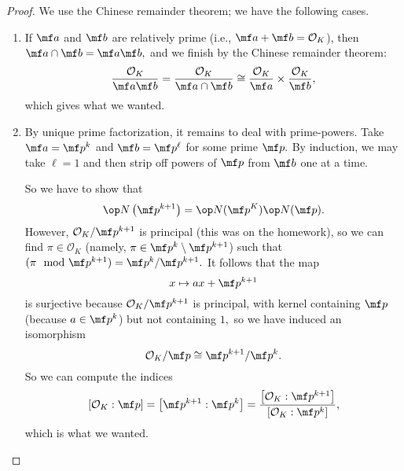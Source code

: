 \documentclass[../notes.tex]{subfiles}
\begin{document}
\begin{proof}
    We use the Chinese remainder theorem; we have the following cases.
    \begin{enumerate}
        \item If $\mf a$ and $\mf b$ are relatively prime (i.e., $\mf a+\mf b=\mathcal O_K$), then $\mf a\cap\mf b=\mf a\mf b,$ and we finish by the Chinese remainder theorem:
        \[\frac{\mathcal O_K}{\mf a\mf b}=\frac{\mathcal O_K}{\mf a\cap\mf b}\cong\frac{\mathcal O_K}{\mf a}\times\frac{\mathcal O_K}{\mf b},\]
        which gives what we wanted.
        \item By unique prime factorization, it remains to deal with prime-powers. Take $\mf a=\mf p^k$ and $\mf b=\mf p^\ell$ for some prime $\mf p.$ By induction, we may take $\ell=1$ and then strip off powers of $\mf p$ from $\mf b$ one at a time.

        So we have to show that
        \[\op N\left(\mf p^{k+1}\right)=\op N(\mf p^K)\op N(\mf p).\]
        However, $\mathcal O_K/\mf p^{k+1}$ is principal (this was on the homework), so we can find $\pi\in\mathcal O_K$ (namely, $\pi\in\mf p^k\setminus\mf p^{k+1}$) such that $(\pi\mod\mf p^{k+1})=\mf p^k/\mf p^{k+1}.$ It follows that the map
        \[x\mapsto ax+\mf p^{k+1}\]
        is surjective because $\mathcal O_K/\mf p^{k+1}$ is principal, with kernel containing $\mf p$ (because $a\in\mf p^k$) but not containing $1,$ so we have induced an isomorphism
        \[\mathcal O_K/\mf p\cong\mf p^{k+1}/\mf p^k.\]
        So we can compute the indices
        \[[\mathcal O_K:\mf p]=\left[\mf p^{k+1}:\mf p^k\right]=\frac{\left[\mathcal O_K:\mf p^{k+1}\right]}{\left[\mathcal O_K:\mf p^k\right]},\]
        which is what we wanted.
        \qedhere
    \end{enumerate}
\end{proof}
\end{document}
